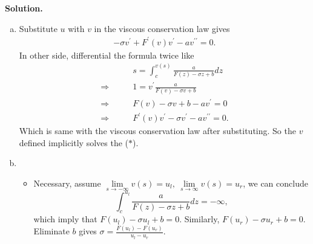 \documentclass[a4paper]{book}
\newenvironment{solution}%
{\noindent\textbf{Solution.}}%
{\qedhere}
\numberwithin{equation}{chapter}
\theoremstyle{definition}
\begin{document}
\begin{solution}
  \begin{enumerate}[(a)]
  \item Substitute $u$ with $v$ in the viscous conservation law gives
    \begin{align*}
      -\sigma v^\prime + F^\prime(v)v^\prime - av^{\prime\prime} = 0.
    \end{align*}
    In other side, differential the formula twice like
    \begin{align*}
      &s = \int_c^{v(s)} \frac{a}{F(z) - \sigma z + b}dz \\
      \Longrightarrow \qquad& 1 = v^\prime \frac{a}{F(v) - \sigma v +b} \\
      \Longrightarrow \qquad& F(v) - \sigma v + b - a v^\prime = 0 \\
      \Longrightarrow \qquad& F^\prime(v)v^\prime - \sigma v^\prime - a v^{\prime\prime} = 0.
    \end{align*}
    Which is same with the viscous conservation law after substituting. So the $v$ defined implicitly solves the ($*$).

    \item
      \begin{itemize}
      \item Necessary, assume $\lim\limits_{s \rightarrow - \infty} v(s) = u_l,\ \lim\limits_{s \rightarrow \infty} v(s) = u_r$, we can conclude
        \[\int_c^{u_l} \frac{a}{F(z) - \sigma z + b}dz = -\infty,\]
        which imply that $F(u_l) - \sigma u_l + b = 0$. Similarly, $F(u_r) - \sigma u_r + b = 0$. Eliminate $b$ gives $\sigma = \frac{F(u_l) - F(u_r)}{u_l - u_r}$.


\end{itemize}
\end{enumerate}
\end{solution}
\end{document}
